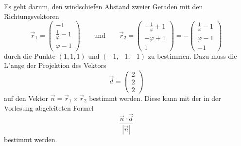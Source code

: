 \begin{loesung}
Es geht darum, den windschiefen Abstand zweier Geraden mit den
Richtungsvektoren
\[
\vec r_1=\begin{pmatrix}
-1\\
\frac1{\varphi}-1\\
\varphi-1
\end{pmatrix}
\qquad\text{und}\qquad
\vec r_2
=\begin{pmatrix}
-\frac1{\varphi}+1\\
-\varphi+1\\
1
\end{pmatrix}
=-\begin{pmatrix}
\frac1{\varphi}-1\\
\varphi-1\\
-1
\end{pmatrix}
\]
durch die Punkte $(1,1,1)$ und $(-1,-1,-1)$ zu bestimmen. Dazu
muss die L"ange der Projektion des Vektors
\[
\vec d= \begin{pmatrix} 2\\2\\2\end{pmatrix}
\]
auf den Vektor $\vec n = \vec r_1\times\vec r_2$ bestimmt werden.
Diese kann mit der in der Vorlesung abgeleiteten Formel
\[
\frac{\vec  n\cdot\vec d}{|\vec n|}
\]
bestimmt werden.


\end{loesung}
